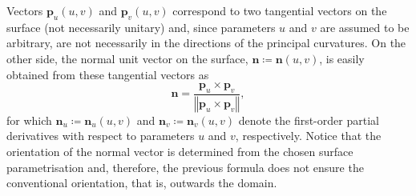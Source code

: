 Vectors $\bm{p}_{u}\left(u,v\right)$ and $\bm{p}_{v}\left(u,v\right)$ correspond to two tangential vectors on the surface (not necessarily unitary) and, since parameters $u$ and $v$ are assumed to be arbitrary, are not necessarily in the directions of the principal curvatures.
On the other side, the normal unit vector on the surface, $\bm{n}\coloneqq\bm{n}\left(u,v\right)$, is easily obtained from these tangential vectors as
\begin{equation}
\bm{n}=\dfrac{\bm{p}_{u}\times\bm{p}_{v}}{\left\Vert\bm{p}_{u}\times\bm{p}_{v}\right\Vert},
\end{equation}
for which $\bm{n}_{u}\coloneqq\bm{n}_{u}\left(u,v\right)$ and $\bm{n}_{v}\coloneqq\bm{n}_{v}\left(u,v\right)$ denote the first-order partial derivatives with respect to parameters $u$ and $v$, respectively.
Notice that the orientation of the normal vector is determined from the chosen surface parametrisation and, therefore, the previous formula does not ensure the conventional orientation, that is, outwards the domain.

